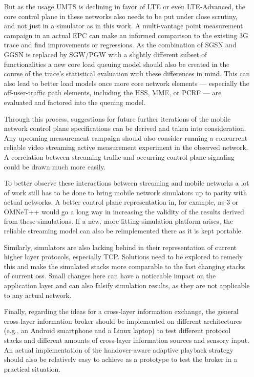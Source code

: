 But as the usage \gls{UMTS} is declining in favor of \gls{LTE} or even \gls{LTE}-Advanced, the core control plane in these networks also needs to be put under close scrutiny, and not just in a simulator as in this work. A multi-vantage point measurement campaign in an actual \gls{EPC} can make an informed comparison to the existing \gls{3G} trace and find improvements or regressions. As the combination of \gls{SGSN} and \gls{GGSN} is replaced by \gls{SGW}/\gls{PGW} with a slightly different subset of functionalities a new core load queuing model should also be created in the course of the trace's statistical evaluation with these differences in mind. This can also lead to better load models once more core network elements --- especially the off-user-traffic path elements, including the \gls{HSS}, \gls{MME}, or \gls{PCRF} --- are evaluated and factored into the queuing model.

Through this process, suggestions for future further iterations of the mobile network control plane specifications can be derived and taken into consideration. Any upcoming measurement campaign should also consider running a concurrent reliable video streaming active measurement experiment in the observed network. A correlation between streaming traffic and occurring control plane signaling could be drawn much more easily.


To better observe these interactions between streaming and mobile networks a lot of work still has to be done to bring mobile network simulators up to parity with actual networks. A better control plane representation in, for example, ns-3 or OMNeT++ would go a long way in increasing the validity of the results derived from these simulations. If a new, more fitting simulation platform arises, the reliable streaming model can also be reimplemented there as it is kept portable.

Similarly, simulators are also lacking behind in their representation of current higher layer protocols, especially \gls{TCP}. Solutions need to be explored to remedy this and make the simulated stacks more comparable to the fast changing stacks of current \glspl{os}. Small changes here can have a noticeable impact on the application layer and can also falsify simulation results, as they are not applicable to any actual network.

Finally, regarding the ideas for a cross-layer information exchange, the general cross-layer information broker should be implemented on different architectures (e.g., an Android smartphone and a Linux laptop) to test different protocol stacks and different amounts of cross-layer information sources and sensory input. An actual implementation of the handover-aware adaptive playback strategy should also be relatively easy to achieve as a prototype to test the broker in a practical situation.




